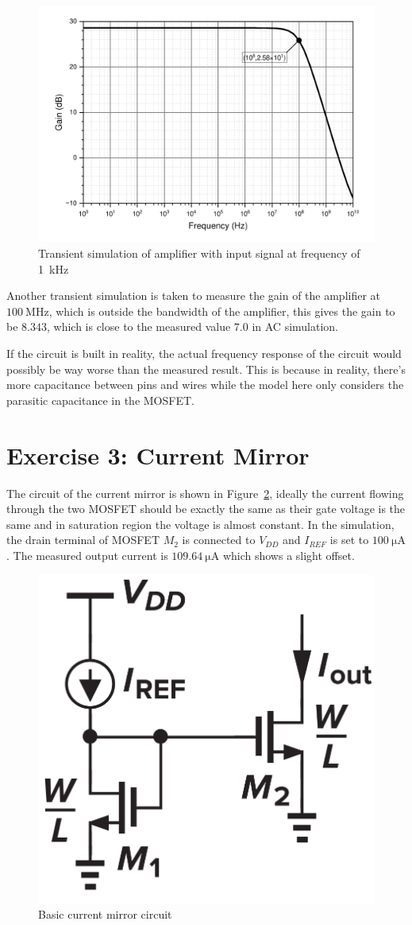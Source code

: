 \documentclass[12pt]{article}   %
\begin{document}
	\begin{figure}[htbp]
		\centering
		\includegraphics[width=0.7\linewidth]{Figures/E2_Inverting_Amplifier/AC_analysis}
		\caption{Transient simulation of amplifier with input signal at frequency of \SI{1}{\kilo\hertz}}
		\label{fig:ac_analysis_inv}
	\end{figure}
	
	Another transient simulation is taken to measure the gain of the amplifier at $\SI{100}{\mega\hertz}$, which is outside the bandwidth of the amplifier, this gives the gain to be $8.343$, which is close to the measured value $7.0$ in AC simulation.
	
	If the circuit is built in reality, the actual frequency response of the circuit would possibly be way worse than the measured result. This is because in reality, there's more capacitance between pins and wires while the model here only considers the parasitic capacitance in the MOSFET.
	
	\newpage
	
	\section{Exercise 3: Current Mirror}
	
	The circuit of the current mirror is shown in Figure~\ref{fig:currentMirror}, ideally the current flowing through the two MOSFET should be exactly the same as their gate voltage is the same and in saturation region the voltage is almost constant. In the simulation, the drain terminal of MOSFET $M_2$ is connected to $V_{DD}$ and $I_{REF}$ is set to $\SI{100}{\micro\ampere}$. The measured output current is $\SI{109.64}{\micro\ampere}$ which shows a slight offset.
	
	\begin{figure}[htbp]
		\centering
		\includegraphics[width=0.3\linewidth]{Figures/E3_Current_Mirror/current_mirror}
		\caption{Basic current mirror circuit}
		\label{fig:currentMirror}
	\end{figure}
	
\end{document}
